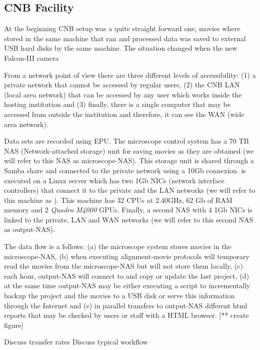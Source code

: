 \subsection{CNB Facility}

At the beginning CNB setup was a quite straight forward one, movies where stored in the  same machine that ran \Scipion and processed data was saved to external USB hard disks by the same machine. The situation changed when the new Falcon-III camera  

From a network point of view there are three different levels of accessibility: (1) a private network that cannot be accessed by regular users, (2) the CNB LAN (local area network)  that can be accessed by any user which works inside the hosting  institution and (3) finally, there is a single computer that may be accessed from outside the institution and therefore, it can see the WAN (wide area network).

Data sets are recorded using EPU. The microscope control system has a 70 TB NAS (Network-attached storage) unit for saving movies as they are obtained (we will refer to this NAS as microscope-NAS). This storage unit is shared through a Samba share and connected to the private network using a 10Gb connexion. \scipion is executed on a Linux server which has two 1Gb NICs (network interface controllers) that connect it to the private and the LAN networks (we will refer to this machine as \scipionbox). This machine has 32 CPUs at 2.40GHz, 62 Gb of RAM memory and 2 \textit{Quadro M4000} GPUs. Finally, a second NAS with 4 1Gb NICs is linked to the private, LAN and WAN networks (we will refer to this second NAS as output-NAS).

The data flow is a follows: (a) the microscope system stores movies in the microscope-NAS, (b) when executing alignment-movie protocols \scipionbox will temporary read the movies from 
the microscope-NAS but will not store them locally, (c) each hour, output-NAS will connect to \scipionbox and copy or update the last \scipion project, (d) at the same time output-NAS may be either executing a script to incrementally backup the \scipion project and the movies to a USB disk or serve this information through the Internet and (e) in parallel \scipionbox transfers to  output-NAS different html reports that may be checked by users or staff with a HTML browser.
[** create figure]

Discuss transfer rates
Discuss typical workflow

